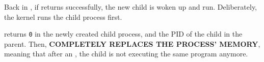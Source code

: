 Back in , if  returns successfully, the new child is woken up and run.
Deliberately, the kernel runs the child process first.

 returns \texttt{0} in the newly created child process, and the PID of the child in the parent.
Then,  \textbf{COMPLETELY REPLACES THE PROCESS' MEMORY}, meaning that after an , the child is not executing the same program anymore.

